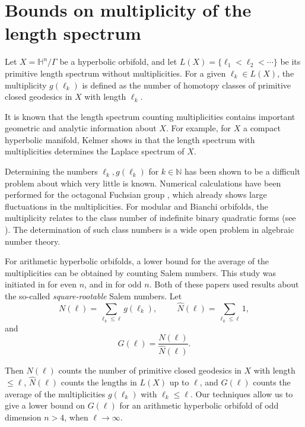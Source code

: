 \documentclass[12pt]{amsart}
\renewcommand{\H}{\mathbb{H}}
\newcommand{\N}{\mathbb{N}}
\theoremstyle{plain}
\begin{document}
\section{Bounds on multiplicity of the length spectrum} \label{s:mean mult}

Let $X=\H^n/\Gamma$ be a hyperbolic orbifold, and let $L(X)=\{\ell_1<\ell_2<\cdots\}$ be its primitive length spectrum without multiplicities. For a given $\ell_k\in L(X)$, the multiplicity $g(\ell_k)$ is defined as the number of homotopy classes of primitive closed geodesics in $X$ with length $\ell_k$.

It is known that the length spectrum counting multiplicities contains important geometric and analytic information about $X$. For example, for $X$ a compact hyperbolic manifold, Kelmer shows in \cite{K14} that the length spectrum with multiplicities determines the Laplace spectrum of $X$.


Determining the numbers $\ell_k, g(\ell_k)$ for $k\in\N$ has been shown to be a difficult problem about which very little is known. Numerical calculations have been performed for the octagonal Fuchsian group \cite{ABS91}, which already shows large fluctuations in the multiplicities. For modular and Bianchi orbifolds, the multiplicity relates to the class number of indefinite binary quadratic forms (see \cite{S82,S83}). The determination of such class numbers is a wide open problem in algebraic number theory.

For arithmetic hyperbolic orbifolds, a lower bound for the average of the multiplicities can be obtained by counting Salem numbers. This study was initiated in \cite{BLMT22} for even $n$, and in \cite{G24} for odd $n$. Both of these papers used results about the so-called \emph{square-rootable} Salem numbers. Let \[N(\ell)=\sum_{\ell_k\leq\ell}g(\ell_k),\hspace{1cm} \widehat{N}(\ell)=\sum_{\ell_k\leq\ell }  1, \]
and
\[G(\ell)=\frac{N(\ell)}{\widehat{N}(\ell)} . \]

Then $N(\ell)$ counts the number of primitive closed geodesics in $X$ with length $\leq \ell$, $\widehat{N}(\ell)$ counts the lengths in $L(X)$ up to $\ell$, and $G(\ell)$ counts the average of the multiplicities $g(\ell_k)$ with $\ell_k\leq\ell$. Our techniques allow us to give a lower bound on $G(\ell)$ for an arithmetic hyperbolic orbifold of odd dimension $n>4$, when $\ell\to\infty$.
\end{document}
